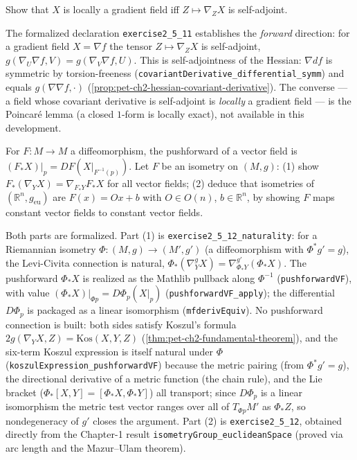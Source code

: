 \begin{remark}
  \label{rem:pet-ch2-ex-11}
  \leanok
  Show that $X$ is locally a gradient field iff $Z\mapsto\nabla_ZX$ is
  self-adjoint.

  The formalized declaration \texttt{exercise2\_5\_11} establishes the
  \emph{forward} direction: for a gradient field $X=\nabla f$ the tensor
  $Z\mapsto\nabla_ZX$ is self-adjoint, $g(\nabla_U\nabla f,V)=g(\nabla_V\nabla f,U)$.
  This is self-adjointness of the Hessian: $\nabla df$ is symmetric by
  torsion-freeness (\texttt{covariantDerivative\_differential\_symm}) and equals
  $g(\nabla\nabla f,\cdot)$ (\cref{prop:pet-ch2-hessian-covariant-derivative}). The
  converse — a field whose covariant derivative is self-adjoint is \emph{locally} a
  gradient field — is the Poincar\'e lemma (a closed $1$-form is locally exact),
  not available in this development.
\end{remark}

\begin{remark}
  \label{rem:pet-ch2-ex-12}
  \leanok
  For $F:M\to M$ a diffeomorphism, the pushforward of a vector field is
  $(F_*X)|_p=DF(X|_{F^{-1}(p)})$. Let $F$ be an isometry on $(M,g)$: (1) show
  $F_*(\nabla_YX)=\nabla_{F_*Y}F_*X$ for all vector fields; (2) deduce that
  isometries of $(\mathbb{R}^n,g_{\mathrm{eu}})$ are $F(x)=Ox+b$ with $O\in O(n)$,
  $b\in\mathbb{R}^n$, by showing $F$ maps constant vector fields to constant vector
  fields.

  Both parts are formalized. Part (1) is
  \texttt{exercise2\_5\_12\_naturality}: for a Riemannian isometry
  $\Phi:(M,g)\to(M',g')$ (a diffeomorphism with $\Phi^*g'=g$), the Levi-Civita
  connection is natural, $\Phi_*(\nabla^g_YX)=\nabla^{g'}_{\Phi_*Y}(\Phi_*X)$. The
  pushforward $\Phi_*X$ is realized as the Mathlib pullback along $\Phi^{-1}$
  (\texttt{pushforwardVF}), with value $(\Phi_*X)|_{\Phi p}=D\Phi_p(X|_p)$
  (\texttt{pushforwardVF\_apply}); the differential $D\Phi_p$ is packaged as a
  linear isomorphism (\texttt{mfderivEquiv}). No pushforward connection is built:
  both sides satisfy Koszul's formula $2g(\nabla_YX,Z)=\mathrm{Kos}(X,Y,Z)$
  (\cref{thm:pet-ch2-fundamental-theorem}), and the six-term Koszul expression is
  itself natural under $\Phi$ (\texttt{koszulExpression\_pushforwardVF}) because
  the metric pairing (from $\Phi^*g'=g$), the directional derivative of a metric
  function (the chain rule), and the Lie bracket ($\Phi_*[X,Y]=[\Phi_*X,\Phi_*Y]$)
  all transport; since $D\Phi_p$ is a linear isomorphism the metric test vector
  ranges over all of $T_{\Phi p}M'$ as $\Phi_*Z$, so nondegeneracy of $g'$ closes
  the argument. Part (2) is \texttt{exercise2\_5\_12}, obtained directly from the
  Chapter-1 result \texttt{isometryGroup\_euclideanSpace} (proved via arc length
  and the Mazur--Ulam theorem).
\end{remark}

